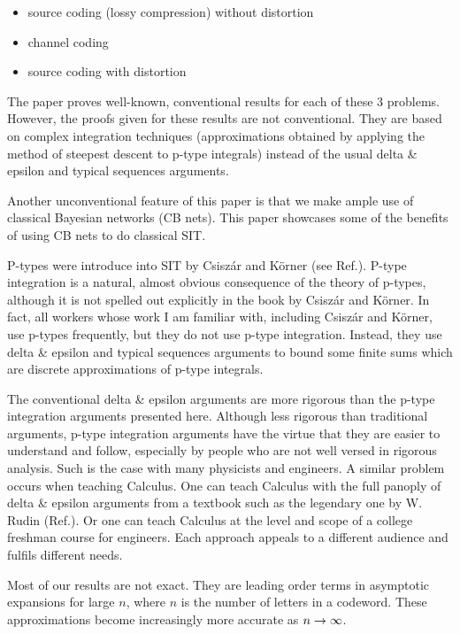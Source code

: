 \begin{itemize}
\item source coding (lossy compression)
without distortion
\item channel coding
\item source coding with distortion
\end{itemize}
The paper proves
well-known, conventional results for
each of these 3 problems. However,
the proofs given for these results
are not conventional. They
are based on complex integration techniques
(approximations obtained by applying
the method of steepest descent to
p-type integrals)
instead of the usual delta \& epsilon
and typical sequences
arguments.

Another
unconventional feature
of this paper
is that we make ample
use of classical Bayesian networks (CB nets).
This paper showcases
some of the benefits of using
CB nets to do classical SIT.


P-types were introduce into SIT
by Csisz\'{a}r and K\"{o}rner (see Ref.\cite{CK}).
P-type integration is
a natural, almost obvious
consequence of the theory of
p-types,
although it is not spelled out
explicitly in the book
by Csisz\'{a}r and K\"{o}rner.
In fact, all workers
whose work I am familiar
with, including Csisz\'{a}r and K\"{o}rner,
use p-types frequently, but
they do not use p-type integration.
Instead, they use delta \& epsilon
and typical sequences
arguments to bound some finite sums
which are discrete approximations
of p-type integrals.

The conventional delta \& epsilon arguments
are more rigorous than
the p-type integration arguments
presented here.
Although less rigorous
than traditional arguments,
p-type integration arguments
have the virtue that they are
easier to understand and follow,
especially
by people who are not well versed
in rigorous analysis.
Such is the case with many
physicists and engineers.
A similar problem occurs
when teaching Calculus.
One can teach
Calculus with the full panoply of
delta \& epsilon arguments
from a textbook such as the
legendary one by W. Rudin (Ref.\cite{Rudin}).
Or one can teach Calculus
at the level and scope of
 a college freshman  course
for engineers.
Each approach appeals to
a different audience and fulfils different
needs.

Most of our results are not
exact. They are
leading order terms
in asymptotic expansions
for large $n$,
where $n$ is the number of letters
in a codeword. These
approximations become increasingly
more accurate as $n\rightarrow \infty$.


